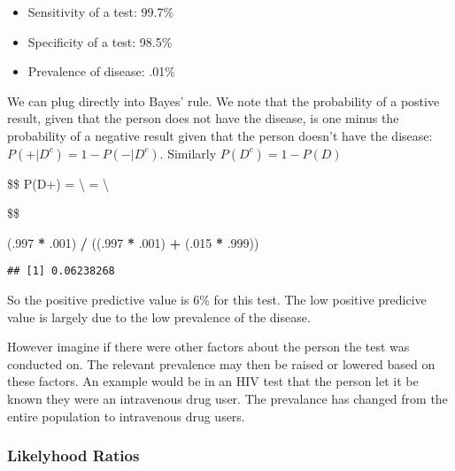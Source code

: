 \documentclass[]{article}
\newenvironment{Shaded}{\begin{snugshade}}{\end{snugshade}}
\newcommand{\DecValTok}[1]{\textcolor[rgb]{0.00,0.00,0.81}{#1}}
\newcommand{\FloatTok}[1]{\textcolor[rgb]{0.00,0.00,0.81}{#1}}
\newcommand{\NormalTok}[1]{#1}
\newcommand{\OperatorTok}[1]{\textcolor[rgb]{0.81,0.36,0.00}{\textbf{#1}}}
\newcommand{\StringTok}[1]{\textcolor[rgb]{0.31,0.60,0.02}{#1}}
\providecommand{\tightlist}{%
  \setlength{\itemsep}{0pt}\setlength{\parskip}{0pt}}
\begin{document}
\begin{itemize}
\tightlist
\item
  Sensitivity of a test: 99.7\%
\item
  Specificity of a test: 98.5\%
\item
  Prevalence of disease: .01\%
\end{itemize}

We can plug directly into Bayes' rule. We note that the probability of a
postive result, given that the person does not have the disease, is one
minus the probability of a negative result given that the person doesn't
have the disease: \(P(+|D^c) = 1 - P(-|D^c)\). Similarly
\(P(D^c) = 1 - P(D)\)

\$\$ P(D\textbar{}+) =  \textbackslash{} =  \textbackslash{}

\$\$

\begin{Shaded}
\begin{Highlighting}[]
\NormalTok{(.}\DecValTok{997} \OperatorTok{*}\StringTok{ }\FloatTok{.001}\NormalTok{) }\OperatorTok{/}\StringTok{ }\NormalTok{((.}\DecValTok{997} \OperatorTok{*}\StringTok{ }\FloatTok{.001}\NormalTok{) }\OperatorTok{+}\StringTok{ }\NormalTok{(.}\DecValTok{015} \OperatorTok{*}\StringTok{ }\FloatTok{.999}\NormalTok{))}
\end{Highlighting}
\end{Shaded}

\begin{verbatim}
## [1] 0.06238268
\end{verbatim}

So the positive predictive value is 6\% for this test. The low positive
predicive value is largely due to the low prevalence of the disease.

However imagine if there were other factors about the person the test
was conducted on. The relevant prevalence may then be raised or lowered
based on these factors. An example would be in an HIV test that the
person let it be known they were an intravenous drug user. The
prevalance has changed from the entire population to intravenous drug
users.

\hypertarget{likelyhood-ratios}{%
\subsubsection{Likelyhood Ratios}\label{likelyhood-ratios}}
\end{document}
